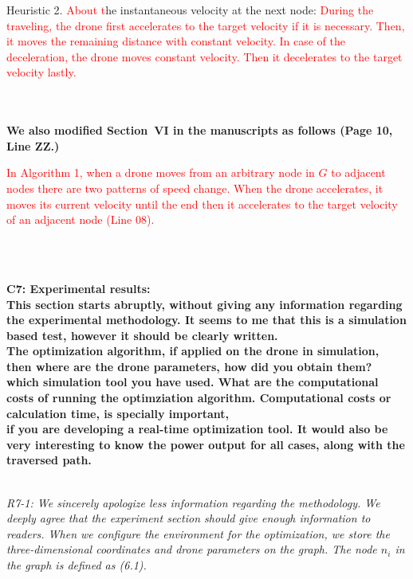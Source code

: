 \documentclass[onecolumn]{IEEEconf}
\begin{document}
\begin{description}
\begin{mdframed}[ linewidth=.75pt, userdefinedwidth=0.9\textwidth]
    Heuristic 2. \textcolor{red}{About t}he instantaneous velocity at the next node: \textcolor{red}{During the traveling, the drone first accelerates to the target velocity if it is necessary. Then, it moves the remaining distance with constant velocity. In case of the deceleration, the drone moves constant velocity. Then it decelerates to the target velocity lastly.}
    \end{mdframed} 
    ~\\
    ~\\
    \textbf{We also modified Section~VI in the manuscripts as follows (Page 10, Line ZZ.)}\\
    \begin{mdframed}[ linewidth=.75pt, userdefinedwidth=0.9\textwidth]
\textcolor{red}{In Algorithm 1, when a drone moves from an arbitrary node in $G$ to adjacent nodes there are two patterns of speed change. When the drone accelerates, it moves its current velocity until the end then it accelerates to the target velocity of an adjacent node (Line 08).}
\end{mdframed}
~\\~\\
    \item \textbf
    {
	C7: Experimental results: \\
	This section starts abruptly, without giving any information regarding the experimental methodology. It seems to me that this is a simulation based test, however it should be clearly written.~\\
	The optimization algorithm, if applied on the drone in simulation, then where are the drone parameters, how did you obtain them?~\\
	which simulation tool you have used. What are the computational costs of running the optimziation algorithm. Computational costs or calculation time, is specially important,~\\
	if you are developing a real-time optimization tool. It would also be very interesting to know the power output for all cases, along with the traversed path.
	}
	~\\
	~\\
	\item \textit
	{
	R7-1: We sincerely apologize less information regarding the methodology. We deeply agree that the experiment section should give enough information to readers. When we configure the environment for the optimization, we store the three-dimensional coordinates and drone parameters on the graph. The node $n_i$ in the graph is defined as (6.1).
}
\end{description}
\end{document}
